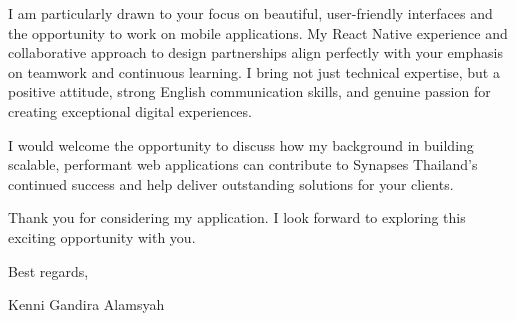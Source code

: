 \documentclass[11pt]{article}
\begin{document}
\vspace{0.3cm}

I am particularly drawn to your focus on beautiful, user-friendly interfaces and the opportunity to work on mobile applications. My React Native experience and collaborative approach to design partnerships align perfectly with your emphasis on teamwork and continuous learning. I bring not just technical expertise, but a positive attitude, strong English communication skills, and genuine passion for creating exceptional digital experiences.

\vspace{0.3cm}

I would welcome the opportunity to discuss how my background in building scalable, performant web applications can contribute to Synapses Thailand's continued success and help deliver outstanding solutions for your clients.

\vspace{0.3cm}

Thank you for considering my application. I look forward to exploring this exciting opportunity with you.

\vspace{0.5cm}

\noindent
Best regards,

\vspace{0.3cm}

\noindent
Kenni Gandira Alamsyah
\end{document}
